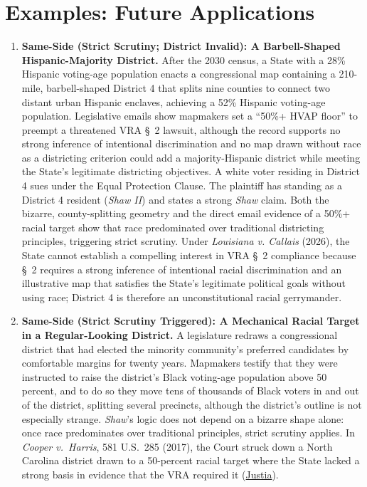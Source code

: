 \documentclass[12pt]{article}
\begin{document}
\section{Examples: Future Applications}
\begin{enumerate}

\item \textbf{Same-Side (Strict Scrutiny; District Invalid): A Barbell-Shaped Hispanic-Majority District.} After the 2030 census, a State with a 28\% Hispanic voting-age population enacts a congressional map containing a 210-mile, barbell-shaped District 4 that splits nine counties to connect two distant urban Hispanic enclaves, achieving a 52\% Hispanic voting-age population. Legislative emails show mapmakers set a ``50\%+ HVAP floor'' to preempt a threatened VRA \S~2 lawsuit, although the record supports no strong inference of intentional discrimination and no map drawn without race as a districting criterion could add a majority-Hispanic district while meeting the State's legitimate districting objectives. A white voter residing in District 4 sues under the Equal Protection Clause. The plaintiff has standing as a District 4 resident (\textit{Shaw II}) and states a strong \textit{Shaw} claim. Both the bizarre, county-splitting geometry and the direct email evidence of a 50\%+ racial target show that race predominated over traditional districting principles, triggering strict scrutiny. Under \textit{Louisiana v. Callais} (2026), the State cannot establish a compelling interest in VRA \S~2 compliance because \S~2 requires a strong inference of intentional racial discrimination and an illustrative map that satisfies the State's legitimate political goals without using race; District 4 is therefore an unconstitutional racial gerrymander.

\item \textbf{Same-Side (Strict Scrutiny Triggered): A Mechanical Racial Target in a Regular-Looking District.} A legislature redraws a congressional district that had elected the minority community's preferred candidates by comfortable margins for twenty years. Mapmakers testify that they were instructed to raise the district's Black voting-age population above 50 percent, and to do so they move tens of thousands of Black voters in and out of the district, splitting several precincts, although the district's outline is not especially strange. \textit{Shaw}'s logic does not depend on a bizarre shape alone: once race predominates over traditional principles, strict scrutiny applies. In \textit{Cooper v.\ Harris}, 581 U.S.\ 285 (2017), the Court struck down a North Carolina district drawn to a 50-percent racial target where the State lacked a strong basis in evidence that the VRA required it (\href{https://supreme.justia.com/cases/federal/us/581/15-1262/}{Justia}).


\end{enumerate}
\end{document}
